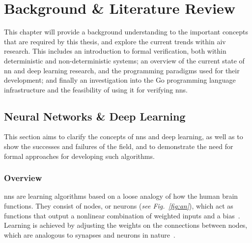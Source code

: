 
\chapter{Background \& Literature Review}\label{Chapter2}


This chapter will provide a background understanding to the important concepts that are required by this thesis, and explore the
current trends within \Gls{aiv} research.
This includes an introduction to formal verification, both within deterministic and non-deterministic systems; an overview of the
current state of \Gls{nn} and deep learning research, and the programming paradigms used for their development; and finally an 
investigation into the Go programming language infrastructure and the feasibility of using it for verifying \glspl{nn}.

\section{Neural Networks \& Deep Learning}
This section aims to clarify the concepts of \glspl{nn} and deep learning, as well as
to show the successes and failures of the field, and to demonstrate the need for
formal approaches for developing such algorithms.

\subsection{Overview}

\glspl{nn} are learning algorithms based on a loose analogy of how the
human brain functions. They consist of nodes, or neurons
(\textit{see Fig.~\ref{fig:an}}), which act as functions that output a
nonlinear combination of weighted inputs and a bias~\citep{Dreyfus2005}.
Learning is achieved by adjusting the weights on the connections between
nodes, which are analogous to synapses and neurons in nature~\citep{Sammut2010}.

